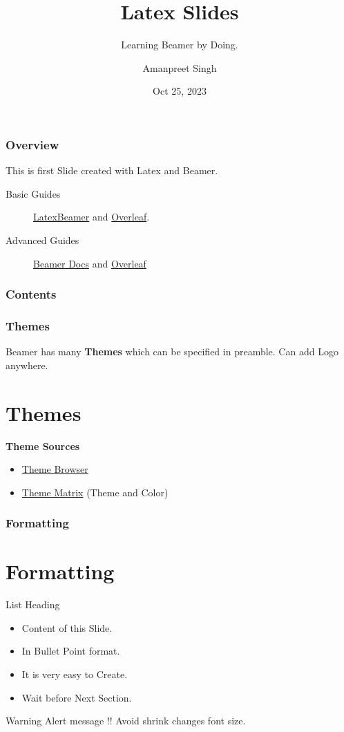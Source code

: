 \documentclass[12pt,[aspectratio=169]{beamer}
\title{Latex Slides}
\subtitle{Learning Beamer by Doing.}
\author{Amanpreet Singh}
\date[Conf 2023] %
{Oct 25, 2023}
\institute[DPS] %
{
  \inst{1}
  Faculty of Physics\\
  Dashmesh Public School
  \and
  \inst{2}
  Faculty of Chemistry\\
  BNMIT
}
\begin{document}
\maketitle

\begin{frame}
\frametitle{Overview}
This is first Slide created with Latex and Beamer.
\break

\begin{description}
    \item[Basic Guides] \href{https://latex-beamer.com/tutorials/beamer-themes/}{LatexBeamer} and  \href{https://www.overleaf.com/learn/latex/Beamer}{Overleaf}.
    \item[Advanced Guides] \href{https://texdoc.org/serve/beamer/0}{Beamer Docs} and \href{https://www.overleaf.com/learn/latex/Beamer_Presentations\%3A_A_Tutorial_for_Beginners_(Part_1)\%E2\%80\%94Getting_Started}{Overleaf}
\end{description}
\end{frame}

\begin{frame}
    \frametitle{Contents}
    \tableofcontents
\end{frame}

\begin{frame}
\frametitle{Themes}
Beamer has many \textbf{Themes} which can be specified in preamble.
Can add Logo \insertlogo \space anywhere.
\break
\section{Themes}
\textbf{Theme Sources}
\begin{itemize}
    \item \href{https://deic.uab.cat/~iblanes/beamer_gallery/index_by_theme.html}{Theme Browser}
    \item \href{https://hartwork.org/beamer-theme-matrix/}{Theme Matrix} (Theme and Color)
\end{itemize}

\end{frame}

\begin{frame}
    \frametitle{Formatting}
    \section{Formatting}
    List Heading
    \begin{itemize}
        \item Content of this Slide.
        \item In Bullet Point format.
        \item It is very easy to Create.
        \item Wait before Next Section.\pause
    \end{itemize}

    \begin{alert}{Warning}
        Alert message !! Avoid shrink changes font size.
    \end{alert}

\end{frame}
\end{document}
